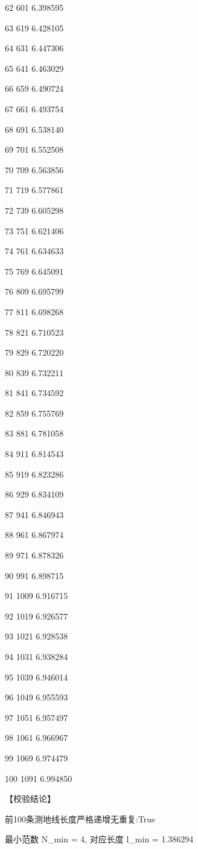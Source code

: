 \documentclass[12pt]{article}
\begin{document}
62 \textbar{} 601 \textbar{} 6.398595

63 \textbar{} 619 \textbar{} 6.428105

64 \textbar{} 631 \textbar{} 6.447306

65 \textbar{} 641 \textbar{} 6.463029

66 \textbar{} 659 \textbar{} 6.490724

67 \textbar{} 661 \textbar{} 6.493754

68 \textbar{} 691 \textbar{} 6.538140

69 \textbar{} 701 \textbar{} 6.552508

70 \textbar{} 709 \textbar{} 6.563856

71 \textbar{} 719 \textbar{} 6.577861

72 \textbar{} 739 \textbar{} 6.605298

73 \textbar{} 751 \textbar{} 6.621406

74 \textbar{} 761 \textbar{} 6.634633

75 \textbar{} 769 \textbar{} 6.645091

76 \textbar{} 809 \textbar{} 6.695799

77 \textbar{} 811 \textbar{} 6.698268

78 \textbar{} 821 \textbar{} 6.710523

79 \textbar{} 829 \textbar{} 6.720220

80 \textbar{} 839 \textbar{} 6.732211

81 \textbar{} 841 \textbar{} 6.734592

82 \textbar{} 859 \textbar{} 6.755769

83 \textbar{} 881 \textbar{} 6.781058

84 \textbar{} 911 \textbar{} 6.814543

85 \textbar{} 919 \textbar{} 6.823286

86 \textbar{} 929 \textbar{} 6.834109

87 \textbar{} 941 \textbar{} 6.846943

88 \textbar{} 961 \textbar{} 6.867974

89 \textbar{} 971 \textbar{} 6.878326

90 \textbar{} 991 \textbar{} 6.898715

91 \textbar{} 1009 \textbar{} 6.916715

92 \textbar{} 1019 \textbar{} 6.926577

93 \textbar{} 1021 \textbar{} 6.928538

94 \textbar{} 1031 \textbar{} 6.938284

95 \textbar{} 1039 \textbar{} 6.946014

96 \textbar{} 1049 \textbar{} 6.955593

97 \textbar{} 1051 \textbar{} 6.957497

98 \textbar{} 1061 \textbar{} 6.966967

99 \textbar{} 1069 \textbar{} 6.974479

100 \textbar{} 1091 \textbar{} 6.994850

【校验结论】

前100条测地线长度严格递增无重复:True

最小范数 N\_min = 4, 对应长度 l\_min = 1.386294
\end{document}
